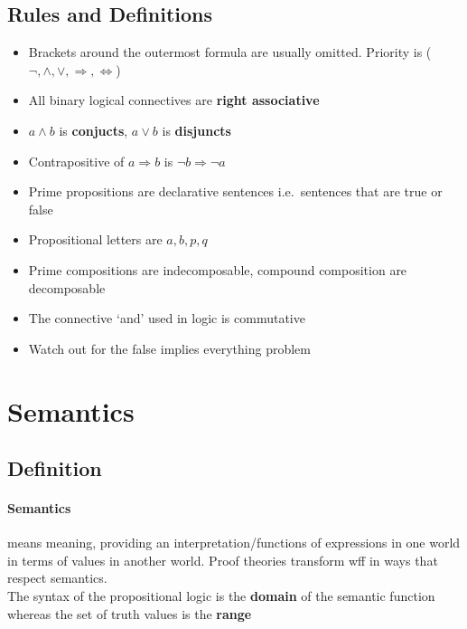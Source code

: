 \documentclass[12pt]{report}
\begin{document}
    \subsection{Rules and Definitions}
      \begin{itemize}
        \item Brackets around the outermost formula are usually omitted.
          Priority is ($\lnot, \land, \lor, \Rightarrow, \Leftrightarrow$)
        \item All binary logical connectives are \textbf{right associative}
        \item $a\land b$ is \textbf{conjucts}, $a\lor b$ is \textbf{disjuncts}
        \item Contrapositive of $a\Rightarrow b$ is $\lnot b\Rightarrow \lnot
          a$
        \item Prime propositions are declarative sentences i.e.\ sentences that
          are true or false
        \item Propositional letters are $a, b, p, q$
        \item Prime compositions are indecomposable, compound composition are
          decomposable
        \item The connective `and' used in logic is commutative
        \item Watch out for the false implies everything problem

      \end{itemize}
    \section{Semantics}
      \subsection{Definition}
      \paragraph{Semantics} means meaning, providing an interpretation/functions of
        expressions in one world in terms of values in another world. Proof
        theories transform wff in ways that respect semantics.\\
        The syntax of the propositional logic is the \textbf{domain} of the
        semantic function whereas the set of truth values is the \textbf{range}
\end{document}
